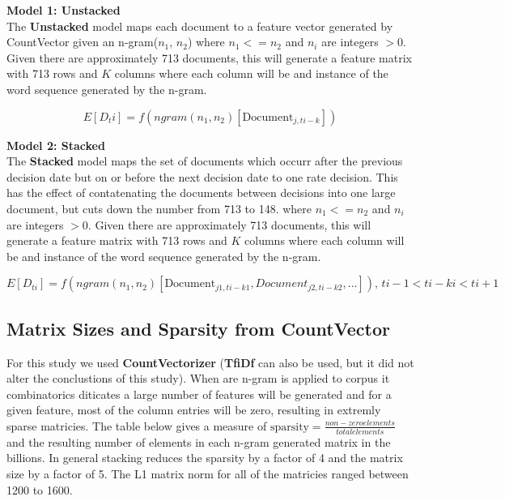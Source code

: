 \documentclass[11pt]{article}
\begin{document}
{\noindent 
\textbf{Model 1: Unstacked}\\
\noindent
The \textbf{Unstacked} model maps each document to a feature vector generated by CountVector given an n-gram($n_1$, $n_2$)
where $n_1 <= n_2$ and $n_i$ are integers $>0$. Given there are approximately 713 documents, this will generate
a feature matrix with 713 rows and $K$ columns where each column will be and instance of the word sequence
generated by the n-gram.

\begin{equation*}
E[D_ti] = f(ngram(n_1, n_2)[\mbox{Document}_{j,ti-k}])
\end{equation*}

\noindent
\textbf{Model 2: Stacked}\\
The \textbf{Stacked}  model maps the set of documents which occurr after the previous decision date but on or before the
next decision date to one rate decision.  This has the effect of contatenating the documents between decisions into
one large document, but cuts down the number from 713 to 148.
where $n_1 <= n_2$ and $n_i$ are integers $>0$. Given there are approximately 713 documents, this will generate
a feature matrix with 713 rows and $K$ columns where each column will be and instance of the word sequence
generated by the n-gram.

\begin{equation*}
E[D_{ti}] = f(ngram(n_1, n_2)[\mbox{Document}_{j1,ti-k1},{Document}_{j2,ti-k2},...]) \text{, } ti-1 < ti-ki < ti+1
\end{equation*}

\subsection{Matrix Sizes and Sparsity from CountVector}

\noindent For this study we used \textbf{CountVectorizer} (\textbf{TfiDf} can also be used, but it did not alter the conclustions of this study).
When are n-gram is applied to corpus it combinatorics diticates a large number of features will be generated and for a given feature, most of the column entries will
be zero, resulting in extremly sparse matricies.  The table below gives a measure of $\mbox{sparsity} = \frac{non-zero elements}{total elements}$ and 
the resulting number of elements in each n-gram generated matrix in the billions. In general stacking reduces the sparsity by a factor of 4 and
the matrix size by a factor of 5. The L1 matrix norm for all of the matricies ranged between 1200 to 1600.\\

}
\end{document}
